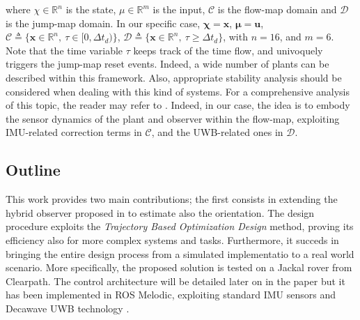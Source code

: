 \medskip
where $\chi\in\mathbb{R}^n$ is the state, $\mu\in\mathbb{R}^m$ is the input, $\mathcal{C}$ is the flow-map domain and $\mathcal{D}$ is the jump-map domain. In our specific case, $\bm{\chi} = \bm{x}$, $\bm{\mu} = \bm{u}$, $\mathcal{C} \triangleq \{\bm{x}\in\mathbb{R}^n, \ \tau \in [0,\Delta t_d)\}$, $\mathcal{D} \triangleq \{\bm{x}\in\mathbb{R}^n, \ \tau\geq\Delta t_d\}$, with $n=16$, and $m=6$. Note that the time variable $\tau$ keeps track of the time flow, and univoquely triggers the jump-map reset events. Indeed, a wide number of plants can be described within this framework. Also, appropriate stability analysis should be considered when dealing with this kind of systems. For a comprehensive analysis of this topic, the reader may refer to \cite{GOEBEL2009}. Indeed, in our case, the idea is to embody the sensor dynamics of the plant and observer within the flow-map, exploiting IMU-related correction terms in $\mathcal{C}$, and the UWB-related ones in $\mathcal{D}$.

\subsection{Outline}
\label{probstat:outline}

This work provides two main contributions; the first consists in extending the hybrid observer proposed in \cite{Oliva03} to estimate also the orientation. The design procedure exploits the \textit{Trajectory Based Optimization Design} method, proving its efficiency also for more complex systems and tasks. Furthermore, it succeds in bringing the entire design process from a simulated implementatio to a real world scenario. More specifically, the proposed solution is tested on a Jackal rover from Clearpath. The control architecture will be detailed later on in the paper but it has been implemented in ROS Melodic, exploiting standard IMU sensors and Decawave UWB technology \cite{UWBdecawave}.






